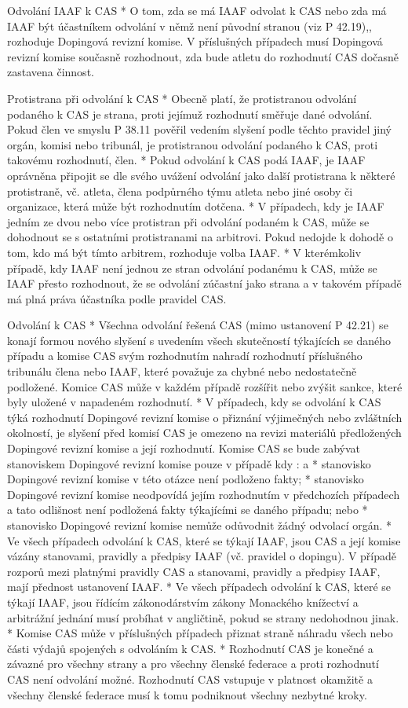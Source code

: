 Odvolání IAAF k CAS
* O tom, zda se má IAAF odvolat k CAS nebo zda má IAAF být účastníkem odvolání v němž není původní stranou (viz P 42.19),, rozhoduje Dopingová revizní komise.  V příslušných případech musí Dopingová revizní komise současně rozhodnout, zda bude atletu do rozhodnutí CAS dočasně zastavena činnost.

Protistrana při odvolání k CAS
* Obecně platí, že protistranou odvolání podaného k CAS je strana, proti jejímuž rozhodnutí směřuje dané odvolání. Pokud člen ve smyslu P 38.11 pověřil vedením slyšení podle těchto pravidel jiný orgán, komisi nebo tribunál, je protistranou odvolání podaného k CAS, proti takovému rozhodnutí, člen.
* Pokud odvolání k CAS podá IAAF, je IAAF oprávněna připojit se dle svého uvážení odvolání jako další protistrana k některé protistraně, vč. atleta, člena podpůrného týmu atleta nebo jiné osoby či organizace, která může být rozhodnutím dotčena.
* V případech, kdy je IAAF jedním ze dvou nebo více protistran při odvolání podaném k CAS, může se dohodnout se s ostatními protistranami na arbitrovi. Pokud nedojde k dohodě o tom, kdo má být tímto arbitrem, rozhoduje volba IAAF.
* V kterémkoliv případě, kdy IAAF není jednou ze stran odvolání podanému k CAS, může se IAAF přesto rozhodnout, že se odvolání zúčastní jako strana a v takovém případě má plná práva účastníka podle pravidel CAS.

Odvolání k CAS
* Všechna odvolání řešená CAS (mimo ustanovení P 42.21)  se konají formou nového slyšení s uvedením všech skutečností týkajících se daného případu a komise CAS svým rozhodnutím nahradí rozhodnutí příslušného tribunálu člena nebo IAAF, které považuje za chybné nebo nedostatečně podložené. Komice CAS může v každém případě rozšířit nebo zvýšit sankce, které byly uložené v napadeném rozhodnutí.
* V případech, kdy se odvolání k CAS týká rozhodnutí Dopingové revizní komise o přiznání výjimečných nebo zvláštních okolností, je slyšení před komisí CAS je omezeno na revizi materiálů předložených Dopingové revizní komise a její rozhodnutí. Komise CAS se bude zabývat stanoviskem Dopingové revizní komise pouze v případě kdy :
  \begitems \style a
  * stanovisko Dopingové revizní komise v této otázce není podloženo fakty;
  * stanovisko Dopingové revizní komise neodpovídá jejím rozhodnutím v předchozích případech a tato odlišnost není podložená fakty týkajícími se daného případu; nebo
  * stanovisko Dopingové revizní komise nemůže odůvodnit žádný odvolací orgán.
  \enditems
* Ve všech případech odvolání k CAS, které se týkají IAAF, jsou CAS a její komise vázány stanovami, pravidly a předpisy IAAF (vč. pravidel o dopingu). V případě rozporů mezi platnými pravidly CAS a stanovami, pravidly a předpisy IAAF, mají přednost ustanovení IAAF.
* Ve všech případech odvolání k CAS, které se týkají IAAF, jsou řídícím zákonodárstvím zákony Monackého knížectví a arbitrážní jednání musí probíhat v angličtině, pokud se strany nedohodnou jinak.
* Komise CAS může v příslušných případech přiznat straně náhradu všech nebo části  výdajů spojených s odvoláním k CAS.
* Rozhodnutí CAS je konečné a závazné pro všechny strany a pro všechny členské federace a proti rozhodnutí CAS není odvolání možné. Rozhodnutí CAS vstupuje v platnost okamžitě a všechny členské federace musí k tomu podniknout všechny nezbytné kroky.
\enditems

